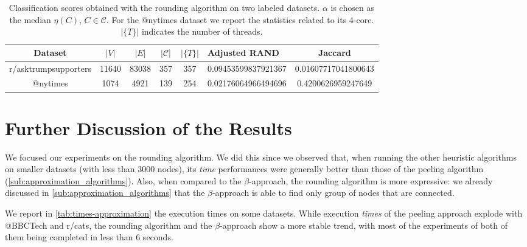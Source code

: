\begin{table}
	\centering
	\caption{Classification scores obtained with the
		rounding algorithm on two labeled datasets. $\alpha $ is chosen as the
		median $\eta(C)$, $C \in
			\mathcal{C} $. For the @nytimes dataset we report the statistics
		related to its $4$-core. $|\{T\}|$ indicates the number of threads.}
	\label{tab:scores-datasets-labeled}
	{\small
		\begin{tabular}{|ccccc p{1.8cm} c|}
			\toprule
			Dataset              & $|V|$         & $|E|$                     & $|\mathcal{C}| $          &
			$|\{T\}| $           & Adjusted RAND & Jaccard                                                                                                            \\
			\midrule
			r/asktrumpsupporters & 11640         & 83038                     & 357
			                     & 357           & \num{0.09453599837921367} & \num{0.01607717041800643}                                                              \\
			@nytimes             & 1074          & 4921                      & 139                       & 254 & \num{0.02176064966494696} & \num{0.4200626959247649} \\
			\bottomrule
		\end{tabular}
	}
\end{table}

\section{Further Discussion of the Results}%
\label{sec:discussion}

We focused our experiments on the rounding algorithm. We did this
since we observed that, when running the other heuristic algorithms on smaller datasets
(with less than $3000$ nodes), its \emph{time} performances were generally better
than those of the peeling algorithm (\autoref{sub:approximation_algorithms}).
Also, when compared to the $\beta$-approach, the rounding algorithm is more
expressive: we already discussed in \autoref{sub:approximation_algorithms} that
the $\beta$-approach is able to find only group of nodes that are connected.

We report in \autoref{tab:times-approximation} the execution times on some
datasets. While execution \emph{times} of the peeling approach explode with
@BBCTech and r/cats, the rounding algorithm and the $\beta $-approach show a
more stable trend, with most of the experiments of both of them being completed
in less than $6$ seconds.

